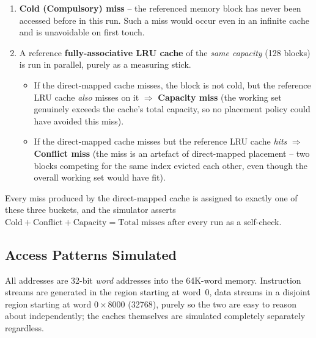 \documentclass[11pt]{article}
\begin{document}
\begin{enumerate}[leftmargin=1.6em]
  \item \textbf{Cold (Compulsory) miss} -- the referenced memory block
        has never been accessed before in this run. Such a miss would
        occur even in an infinite cache and is unavoidable on first
        touch.
  \item A reference \textbf{fully-associative LRU cache} of the
        \emph{same capacity} (128 blocks) is run in parallel, purely
        as a measuring stick.
        \begin{itemize}
          \item If the direct-mapped cache misses, the block is not
                cold, but the reference LRU cache \emph{also} misses on
                it $\Rightarrow$ \textbf{Capacity miss} (the working set
                genuinely exceeds the cache's total capacity, so no
                placement policy could have avoided this miss).
          \item If the direct-mapped cache misses but the reference LRU
                cache \emph{hits} $\Rightarrow$ \textbf{Conflict miss}
                (the miss is an artefact of direct-mapped placement --
                two blocks competing for the same index evicted each
                other, even though the overall working set would have
                fit).
        \end{itemize}
\end{enumerate}

Every miss produced by the direct-mapped cache is assigned to exactly
one of these three buckets, and the simulator asserts
$\text{Cold}+\text{Conflict}+\text{Capacity} = \text{Total misses}$
after every run as a self-check.

\subsection{Access Patterns Simulated}

All addresses are 32-bit \emph{word} addresses into the 64K-word memory.
Instruction streams are generated in the region starting at word~0,
data streams in a disjoint region starting at word $0{\times}8000$
(32768), purely so the two are easy to reason about independently; the
caches themselves are simulated completely separately regardless.
\end{document}
